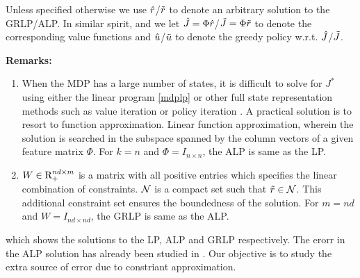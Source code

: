 Unless specified otherwise we use $\hat{r}$/$\tilde{r}$ to denote an arbitrary solution to the GRLP/ALP. In similar spirit, and we let $\hat{J}=\Phi \hat{r}$/$\tilde{J}=\Phi \tilde{r}$ to denote the corresponding value functions and $\hat{u}$/$\tilde{u}$ to denote the greedy policy w.r.t. $\hat{J}$/$\tilde{J}$.\par
\textbf{Remarks:}
\begin{enumerate}
\item When the MDP has a large number of states, it is difficult to solve for $J^*$ using either the linear program \eqref{mdplp} or other full state representation methods such as value iteration or policy iteration \cite{BertB}. A practical solution is to resort to function approximation. Linear function approximation, wherein the solution is searched in the subspace spanned by the column vectors of a given feature matrix $\Phi$. For $k=n$ and $\Phi=I_{n\times n}$, the ALP is same as the LP.
\item $W \in \mathrm{R}^{nd\times m}_+$ is a matrix with all positive entries which specifies the linear combination of constraints. $\mathcal{N}$ is a compact set such that $\tilde{r} \in \mathcal{N}$. This additional constraint set ensures the boundedness of the solution. For $m=nd$ and $W=I_{nd\times nd}$, the GRLP is same as the ALP.
\end{enumerate}
\FloatBarrier

 which shows the solutions to the LP, ALP and GRLP respectively. The erorr in the ALP solution has already been studied in \cite{ALP}. Our objective is to study the extra source of error due to constriant approximation.
\begin{comment}
In addition, we answer the following questions related to constraint reduction in ALP that have so far remained open. \\
$\bullet$ As a natural generalization of the RLP, what happens if we define a generalized reduced linear program (GRLP) whose constraints are positive linear combinations of the original constraints of the ALP?\\
$\bullet$ Unlike \cite{CS} which provides error bounds for a specific RLP formulated using an idealized sampling distribution, is it possible to provide error bounds for any GRLP (and hence any RLP)?
In this paper, we address both of the questions above.
\end{comment}
